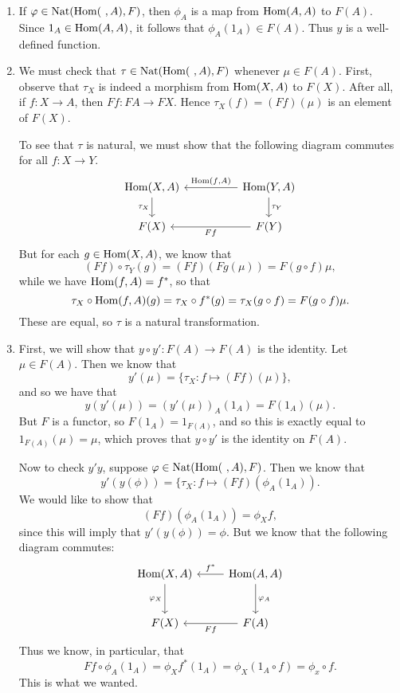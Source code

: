 \documentclass[../../solutions.tex]{subfiles}
\begin{document}
\begin{exercise} \leavevmode
\begin{enumerate}
\item
If $\varphi\in\operatorname{Nat}(\operatorname{Hom}(~,A),F)$, then $\phi_A$ is a map from $\operatorname{Hom}(A,A)$ to $F(A)$.
Since $1_A\in\operatorname{Hom}(A,A)$, it follows that $\phi_A(1_A)\in F(A)$.
Thus $y$ is a well-defined function.
\item
We must check that $\tau\in\operatorname{Nat}(\operatorname{Hom}(~,A),F)$ whenever $\mu\in F(A)$.
First, observe that $\tau_X$ is indeed a morphism from $\operatorname{Hom}(X,A)$ to $F(X)$.
After all, if $f:X\to A$, then $Ff:FA\to FX$.
Hence $\tau_X(f)=(Ff)(\mu)$ is an element of $F(X)$.

To see that $\tau$ is natural, we must show that the following diagram commutes for all $f:X\to Y$.
\[
\begin{tikzcd}[column sep=huge]
\Hom(X,A)\ar[d,"\tau_X",swap] & \Hom(Y,A)\ar[l,"\Hom(f{,}A)",swap]\ar[d,"\tau_Y"] \\
F(X) & F(Y)\ar[l,"Ff"]
\end{tikzcd}
\]
But for each $g\in\operatorname{Hom}(X,A)$, we know that
\[(Ff)\circ\tau_Y(g)=(Ff)(Fg(\mu))=F(g\circ f)\mu,\]
while we have $\operatorname{Hom}(f,A)=f^*$, so that
\[\tau_X\circ\operatorname{Hom}(f,A)(g)=\tau_X\circ f^*(g)=\tau_X(g\circ f)=F(g\circ f)\mu.\]
These are equal, so $\tau$ is a natural transformation.

\item
First, we will show that $y\circ y':F(A)\to F(A)$ is the identity.
Let $\mu\in F(A)$.
Then we know that
\[y'(\mu)=\{\tau_X:f\mapsto(Ff)(\mu)\},\]
and so we have that
\[y(y'(\mu))=(y'(\mu))_A(1_A)=F(1_A)(\mu).\]
But $F$ is a functor, so $F(1_A)=1_{F(A)}$, and so this is exactly equal to $1_{F(A)}(\mu)=\mu$, which proves that $y\circ y'$ is the identity on $F(A)$.

Now to check $y'y$, suppose $\varphi\in\operatorname{Nat}(\operatorname{Hom}(~,A),F)$.
Then we know that
\[y'(y(\phi))=\{\tau_X:f\mapsto(Ff)(\phi_A(1_A)).\]
We would like to show that
\[(Ff)(\phi_A(1_A))=\phi_Xf,\]
since this will imply that $y'(y(\phi))=\phi$.
But we know that the following diagram commutes:
\[
\begin{tikzcd}[row sep=large]
\Hom(X,A)\ar[d,"\phi_X",swap] & \Hom(A,A)\ar[l,"f^*",swap]\ar[d,"\phi_A"] \\
F(X) & F(A)\ar[l,"Ff"]
\end{tikzcd}
\]
Thus we know, in particular, that
\[Ff\circ\phi_A(1_A)=\phi_Xf^*(1_A)=\phi_X(1_A\circ f)=\phi_x\circ f.\]
This is what we wanted.


\end{enumerate}
\end{exercise}
\end{document}

